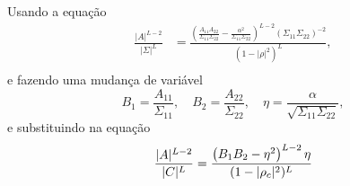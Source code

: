 Usando a equação 
\begin{align*}
	\frac{|A|^{L-2}}{|\Sigma|^{L}}&=\frac{\left(\frac{A_{11}A_{22}}{\Sigma_{11}\Sigma_{22}}-\frac{\alpha^2}{\Sigma_{11}\Sigma_{22}}\right)^{L-2}(\Sigma_{11}\Sigma_{22})^{-2}}{(1-|\rho|^2)^{L}},\\
\end{align*}
e fazendo uma mudança de variável 
\begin{equation*}
	B_1=\frac{A_{11}}{\Sigma_{11}},\quad B_2=\frac{A_{22}}{\Sigma_{22}},\quad \eta=\frac{\alpha}{\sqrt{\Sigma_{11}\Sigma_{22}}},
\end{equation*}
e substituindo na equação
\begin{equation}\label{ap:eq_aux1}
	\frac{|A|^{L-2}}{|C|^{L}}=\frac{\left(B_1B_2-\eta^2\right)^{L-2}\eta}{(1-|\rho_c|^2)^{L}}\\
\end{equation}


